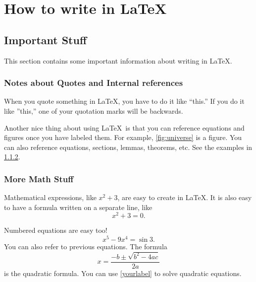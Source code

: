 \chapter{How to write in \LaTeX}

\section{Important Stuff}

This section contains some important information about writing in \LaTeX.

\subsection{Notes about Quotes and Internal references}

When you quote something in \LaTeX, you have to do it like ``this.''
If you do it like ''this,'' one of your quotation marks will be backwards.

Another nice thing about using \LaTeX \ is that you can reference 
equations and figures once you have labeled them. For example, \cref{fig:universe} is a figure. You can also 
reference equations, sections, lemmas, theorems, etc. See the
examples in \cref{sec:moremath}.



\subsection{More Math Stuff}
\label{sec:moremath}

Mathematical expressions, like $x^{2} + 3$, are easy to create in \LaTeX.
It is also easy to have a formula written on a separate line, like \[x^{2} + 3 = 0.\]



Numbered equations are easy too!
\begin{equation}
	\label{eq:simpleequation}
	x^{5} - 9x^{4} = \sin 3.
\end{equation}
You can also refer to previous equations.
The formula
\begin{equation}
	x = \frac{-b \pm \sqrt{b^{2} - 4ac}}{2a} \label{yourlabel}
\end{equation}
is the quadratic formula.
You can use \cref{yourlabel} to solve quadratic equations.


